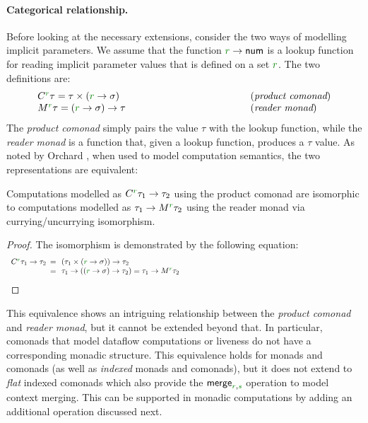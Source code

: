 \paragraph{Categorical relationship.}
Before looking at the necessary extensions, consider the two ways of modelling implicit
parameters. We assume that the function $\cclrd{r} \rightarrow \ident{num}$ is a lookup function
for reading implicit parameter values that is defined on a set $\cclrd{r}$. The two definitions
are:
%
\begin{equation*}
\begin{array}{lll}
 \ctyp{\cclrd{r}}\tau = \tau \times (\cclrd{r} \rightarrow \sigma) &~\hspace{10em}~& (\emph{product comonad}) \\
 \mtyp{\cclrd{r}}\tau = (\cclrd{r} \rightarrow \sigma) \rightarrow \tau && (\emph{reader monad})
\end{array}
\end{equation*}
%
The \emph{product comonad} simply pairs the value $\tau$ with the lookup function, while
the \emph{reader monad} is a function that, given a lookup function, produces a $\tau$ value.
As noted by Orchard \cite{comonads-vs-monads}, when used to model computation semantics, the
two representations are equivalent:
%
\begin{remark}
Computations modelled as $\ctyp{\cclrd{r}}{\tau_1}\rightarrow\tau_2$ using the product comonad
are isomorphic to computations modelled as $\tau_1\rightarrow\mtyp{\cclrd{r}}{\tau_2}$ using the
reader monad via currying/uncurrying isomorphism.
\end{remark}
\begin{proof}
The isomorphism is demonstrated by the following equation:
\begin{equation*}
\begin{array}{lll}
 \ctyp{\cclrd{r}}{\tau_1} \rightarrow \tau_2 &\narrow{=}&
 (\tau_1 \times (\cclrd{r} \rightarrow \sigma)) \rightarrow \tau_2 \\
 &\narrow{=}& \tau_1 \rightarrow ((\cclrd{r} \rightarrow \sigma) \rightarrow \tau_2) =
 \tau_1 \rightarrow \mtyp{\cclrd{r}}{\tau_2} \hspace{23em}\qedhere \\
\end{array}
\end{equation*}
\end{proof}

\noindent
This equivalence shows an intriguing relationship between the \emph{product comonad} and
\emph{reader monad}, but it cannot be extended beyond that. In particular, comonads that model
dataflow computations or liveness do not have a corresponding monadic structure.
This equivalence holds for monads and comonads (as well as \emph{indexed} monads
and comonads), but it does not extend to \emph{flat} indexed comonads which also provide
the $\ident{merge}_{\cclrd{r}, \cclrd{s}}$ operation to model context merging. This can be
supported in monadic computations by adding an additional operation discussed next.

